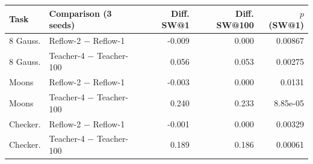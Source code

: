 \begin{tabular}{llrrr}
\toprule
Task & Comparison (3 seeds) & Diff. SW@1 & Diff. SW@100 & $p$ (SW@1) \\
\midrule
8 Gauss. & Reflow-2 $-$ Reflow-1 & -0.009 & 0.000 & 0.00867 \\
8 Gauss. & Teacher-4 $-$ Teacher-100 & 0.056 & 0.053 & 0.00275 \\
Moons & Reflow-2 $-$ Reflow-1 & -0.003 & 0.000 & 0.0131 \\
Moons & Teacher-4 $-$ Teacher-100 & 0.240 & 0.233 & 8.85e-05 \\
Checker. & Reflow-2 $-$ Reflow-1 & -0.001 & 0.000 & 0.00329 \\
Checker. & Teacher-4 $-$ Teacher-100 & 0.189 & 0.186 & 0.00061 \\
\bottomrule
\end{tabular}
